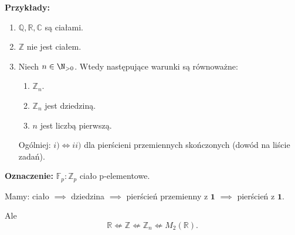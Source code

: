 \textbf{Przykłady:}
\begin{enumerate}[label=\arabic*)]
	\item $\mathbb{Q}, \mathbb{R} , \mathbb{C}  $ są ciałami.
	\item $\mathbb{Z} $ nie jest ciałem.
	\item Niech $n\in \N_{>0}$. Wtedy następujące warunki są równoważne:
		\begin{enumerate}[label=\roman*)]
			\item $\mathbb{Z}_{n}$.
			\item $\mathbb{Z} _{n} $ jest dziedziną.
			\item $n$ jest liczbą pierwszą.
		\end{enumerate}
		\noindent Ogólniej: $i)\iff ii)$ dla pierścieni przemiennych skończonych (dowód na liście zadań).
\end{enumerate}
\noindent \textbf{Oznaczenie: } $\mathbb{F}_{p}: \mathbb{Z}_{p}$ ciało p-elementowe. 

\begin{remark}
	Mamy:
	ciało $\implies$ dziedzina $\implies$ pierścień przemienny z $\mathbf{1}$ $\implies$ pierścień z $\mathbf{1}$.

	Ale
	\[
	\mathbb{R} \nLeftarrow \mathbb{Z} \nLeftarrow \mathbb{Z} _{n} \nLeftarrow M_{2}\left( \mathbb{R}  \right) 
	.\] 
\end{remark} 

